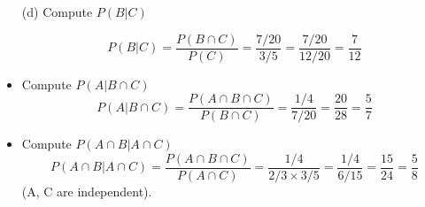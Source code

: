 \documentclass[a4paper,12pt]{article}
\begin{document}
\begin{itemize}
\item[(d)] Compute $P (B | C)$

\[
P (B | C) = \frac{P( B \cap C)}{P (C)} = \frac{7/20}{3/5} = \frac{7/20}{12/20} = \frac{7}{12}\]

\item Compute $P (A | B  \cap C)$ 
\[
P (A | B  \cap C) = \frac{P( A \cap B \cap C)}{P (B \cap C)} = \frac{1/4}{7/20} = \frac{20}{28} = \frac{5}{7}\]

\item Compute $P (A \cap B | A \cap C)$ 
\[
P (A \cap B | A \cap C) = \frac{P( A \cap B \cap C)}{P (A \cap C)} = \frac{1/4}{2/3 \times 3/5} = \frac{1/4}{6/15} = \frac{15}{24} = \frac{5}{8}\]
(A, C are independent).
\end{itemize}
\end{document}
